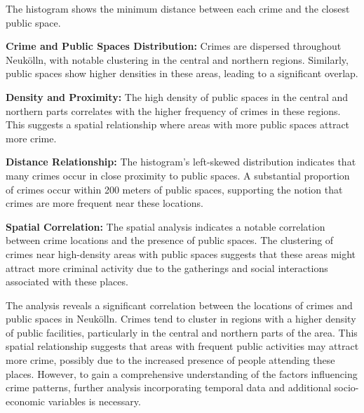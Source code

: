 \begin{figure}[h]
\end{figure}
The histogram shows the minimum distance between each crime and the closest public space. 

\textbf{Crime and Public Spaces Distribution:} Crimes are dispersed throughout Neukölln, with notable clustering in the central and northern regions. Similarly, public spaces show higher densities in these areas, leading to a significant overlap. 

\textbf{Density and Proximity:} The high density of public spaces in the central and northern parts correlates with the higher frequency of crimes in these regions. This suggests a spatial relationship where areas with more public spaces attract more crime. 

\textbf{Distance Relationship:} The histogram's left-skewed distribution indicates that many crimes occur in close proximity to public spaces. A substantial proportion of crimes occur within 200 meters of public spaces, supporting the notion that crimes are more frequent near these locations. 

\textbf{Spatial Correlation:} The spatial analysis indicates a notable correlation between crime locations and the presence of public spaces. The clustering of crimes near high-density areas with public spaces suggests that these areas might attract more criminal activity due to the gatherings and social interactions associated with these places. 

The analysis reveals a significant correlation between the locations of crimes and public spaces in Neukölln. Crimes tend to cluster in regions with a higher density of public facilities, particularly in the central and northern parts of the area. This spatial relationship suggests that areas with frequent public activities may attract more crime, possibly due to the increased presence of people attending these places. However, to gain a comprehensive understanding of the factors influencing crime patterns, further analysis incorporating temporal data and additional socio-economic variables is necessary. 
